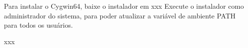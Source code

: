 \documentclass[
	12pt,				%
	twoside,			%
	a4paper,			%
	english,			%
	french,				%
	spanish,			%
	brazil				%
	]{abntex2}
\begin{document}
Para instalar o Cygwin64, baixe o instalador em xxx
Execute o instalador como administrador do sistema, para poder atualizar a variável de ambiente
PATH para todos os usuários.

xxx










\postextual
\end{document}
